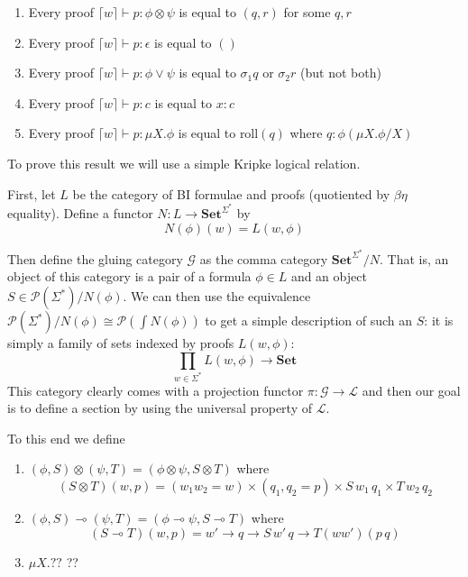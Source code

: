 \documentclass[sigconf,anonymous,review,screen]{acmart}
\newcommand{\Set}{\mathbf{Set}}
\newif\ifdraft
\newcommand{\pedro}[1]{\ifdraft{\color{red}[{\bf Pedro}: #1]}\fi}
\begin{document}
\begin{enumerate}
\item Every proof $\lceil w \rceil \vdash p : \phi \otimes \psi$ is equal to $(q,r)$ for some $q,r$
\item Every proof $\lceil w \rceil \vdash p : \epsilon$ is equal to $()$
\item Every proof $\lceil w \rceil \vdash p : \phi \vee \psi$ is equal to $\sigma_1q$ or $\sigma_2 r$ (but not both)
\item Every proof $\lceil w \rceil \vdash p : c$ is equal to $x:c$
\item Every proof $\lceil w \rceil \vdash p : \mu X. \phi$ is equal to $\textrm{roll}(q)$ where $q : \phi(\mu X.\phi/X)$
\end{enumerate}

To prove this result we will use a simple Kripke logical relation.

First, let $L$ be the category of BI formulae and proofs (quotiented
by $\beta\eta$ equality). Define a functor $N : L \to \Set^{\Sigma^*}$ by
\[ N(\phi)(w) = L(w,\phi) \]

Then define the gluing category $\mathcal G$ as the comma category
$\Set^{\Sigma^*}/N$. That is, an object of this category is a pair of
a formula $\phi \in L$ and an object $S \in \mathcal
P(\Sigma^*)/N(\phi)$. We can then use the equivalence $\mathcal
P(\Sigma^*)/N(\phi) \cong \mathcal P(\int N(\phi))$ to get a simple
description of such an $S$: it is simply a family of sets indexed by
proofs $L(w,\phi)$:
\[ \prod_{w\in\Sigma^*} L(w,\phi) \to \Set \]
This category clearly comes with a projection functor $\pi : \mathcal
G \to \mathcal L$ and then our goal is to define a section by using
the universal property of $\mathcal L$.

To this end we define
\pedro{I'm pretty sure that these definitions have been somewhat presented
  in ``Glueing and orthogonality for models of linear logic'' - Hyland and Schalk.
We should probably cite them so that we don't have to rederive their constructions and proofs here.}
\begin{enumerate}
\item $(\phi, S) \otimes (\psi, T) = (\phi \otimes \psi, S\otimes T)$ where
  \[ (S \otimes T)(w, p) = (w_1w_2 = w) \times (q_1,q_2 = p) \times S\,w_1\,q_1 \times T\,w_2\,q_2\]
\item $(\phi, S) \multimap (\psi, T) = (\phi \multimap \psi, S \multimap T)$ where
  \[ (S \multimap T)(w,p) = w' \to q \to S\,w'\,q \to T (ww') (p\,q) \]
\item $\mu X. ??$ ??
\end{enumerate}
\end{document}
